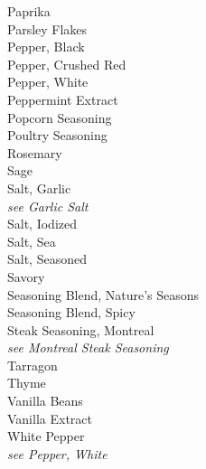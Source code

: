 \documentclass[twocolumn]{article}
\newcommand{\cf}[2]{#1\\\indent\emph{see #2}}
\begin{document}
Paprika\\
Parsley Flakes\\
Pepper, Black\\
Pepper, Crushed Red\\
Pepper, White\\
Peppermint Extract\\
Popcorn Seasoning\\
Poultry Seasoning\\
Rosemary\\
Sage\\
\cf{Salt, Garlic}{Garlic Salt}\\
Salt, Iodized\\
Salt, Sea\\
Salt, Seasoned\\
Savory\\
Seasoning Blend, Nature's Seasons\\
Seasoning Blend, Spicy\\
\cf{Steak Seasoning, Montreal}{Montreal Steak Seasoning}\\
Tarragon\\
Thyme\\
Vanilla Beans\\
Vanilla Extract\\
\cf{White Pepper}{Pepper, White}\\
\end{document}
